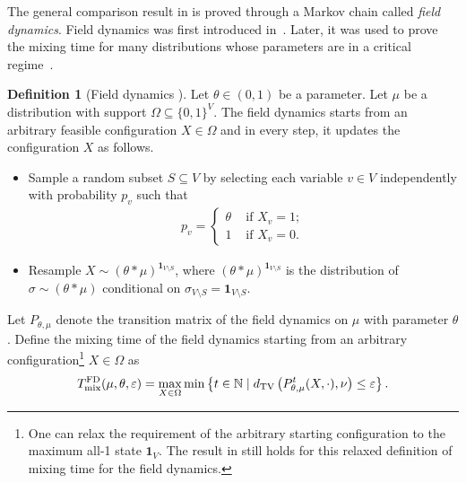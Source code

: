 \documentclass[11pt,a4paper]{article}
\newcommand{\DTV}[2]{d_{\mathrm{TV}}\left({#1},{#2}\right)}
\renewcommand{\epsilon}{\varepsilon}
\newcommand{\mixfd}{T_{\textnormal{mix}}^{\textnormal{FD}}}
\theoremstyle{definition}
\newtheorem{definition}[theorem]{Definition}
\def\*#1{\mathbf{#1}} %
\begin{document}
The general comparison result in  is proved through a Markov chain called \emph{field dynamics}. %
Field dynamics was first introduced in~\cite{CFYZ21}. Later, it was used to prove the mixing time for many distributions whose parameters are in a critical regime~\cite{AJKPV22,CFYZ22,ChenE22,CZ23,Chen0Y23,chen2024rapid}.

\begin{definition}[Field dynamics \cite{CFYZ21}]\label{def:field-dynamics}
    Let $\theta \in (0,1)$ be a parameter. Let $\mu$ be a distribution with support $\Omega \subseteq \{0,1\}^V$. The field dynamics starts from an arbitrary feasible configuration $X \in \Omega$ and in every step, it updates the configuration $X$ as follows. 
    \begin{itemize}
        \item Sample a random subset $S \subseteq V$ by selecting each variable $v \in V$ independently with probability $p_v$ such that 
        \begin{align}\label{eq:field-dynamics-p}
             p_v = \begin{cases}
                \theta & \text{ if } X_v = 1;\\
                1 & \text{ if } X_v = 0.
            \end{cases}
        \end{align}
        \item Resample $X \sim (\theta * \mu)^{\*1_{V \setminus S}}$, where $(\theta * \mu)^{\*1_{V \setminus S}}$ is the distribution of $\sigma \sim (\theta * \mu)$ conditional on $\sigma_{V \setminus S}  = \*1_{V \setminus S}$.
    \end{itemize}
    \end{definition}
    
    Let $P_{\theta,\mu}$ denote the transition matrix of the field dynamics on $\mu$ with parameter $\theta$. Define the mixing time of the field dynamics starting from an arbitrary configuration\footnote{One can relax the requirement of the arbitrary starting configuration to the maximum all-1 state $\*1_V$. The result in  still holds for this relaxed definition of mixing time for the field dynamics.} $X \in \Omega$ as 
    \begin{align*}
        \mixfd(\mu,\theta,\epsilon) = \max_{X \in \Omega} \min\left\{t \in \mathbb{N} \mid \DTV{P_{\theta,\mu}^t(X,\cdot)}{\nu}\leq \epsilon\right\}.
    \end{align*}
\end{document}
